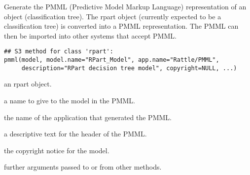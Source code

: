 \begin{Description}\relax
Generate the PMML (Predictive Model Markup Language) representation of
an  object (classification tree).  The rpart object
(currently expected to be a classification tree) is converted into a
PMML representation. The PMML can then be imported into other systems
that accept PMML.
\end{Description}
\begin{Usage}
\begin{verbatim}
## S3 method for class 'rpart':
pmml(model, model.name="RPart_Model", app.name="Rattle/PMML",
     description="RPart decision tree model", copyright=NULL, ...)
\end{verbatim}
\end{Usage}
\begin{Arguments}
\begin{ldescription}
\item[\code{model}] an rpart object.
\item[\code{model.name}] a name to give to the model in the PMML.
\item[\code{app.name}] the name of the application that generated the PMML.
\item[\code{description}] a descriptive text for the header of the PMML.
\item[\code{copyright}] the copyright notice for the model.
\item[\code{...}] further arguments passed to or from other methods.
\end{ldescription}
\end{Arguments}
